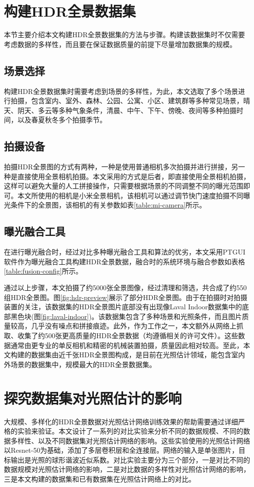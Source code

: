 \section{构建HDR全景数据集}

本节主要介绍本文构建HDR全景数据集的方法与步骤。构建该数据集时不仅需要考虑数据的多样性，而且要在保证数据质量的前提下尽量增加数据集的规模。
\subsection{场景选择}
构建HDR全景数据集时需要考虑到场景的多样性，为此，本文选取了多个场景进行拍摄，包含室内、室外、森林、公园、公寓、小区、建筑群等多种常见场景，晴天、阴天、多云等多种气象条件，清晨、中午、下午、傍晚、夜间等多种拍摄时间，以及春夏秋冬多个拍摄季节。
\subsection{拍摄设备}
拍摄HDR全景图的方式有两种，一种是使用普通相机多次拍摄并进行拼接，另一种是直接使用全景相机拍摄。本文采用的方式是后者，即直接使用全景相机拍摄，这样可以避免大量的人工拼接操作，只需要根据场景的不同调整不同的曝光范围即可。本文所使用的相机是小米全景相机\cite{xiaomi}，该相机可以通过调节快门速度拍摄不同曝光条件下的全景图，该相机的有关参数如表\ref{table:mi-camera}所示。
\subsection{曝光融合工具}
在进行曝光融合时，经过对比多种曝光融合工具和算法的优劣，本文采用PTGUI软件\cite{ptgui}作为曝光融合工具构建HDR全景数据，融合时的系统环境与融合参数如表格\ref{table:fusion-config}所示。


通过以上步骤，本文拍摄了约5000张全景图像，经过清理和筛选，共合成了约550组HDR全景图。图\ref{fig:hdr-preview}展示了部分HDR全景图。由于在拍摄时对拍摄装置的关注，该数据集的HDR全景图片底部没有出现像Laval Indoor数据集\cite{gardner2017learning}中的底部黑色块(图\ref{fig:laval-indoor})。该数据集包含了多种场景和光照条件，而且图片质量较高，几乎没有噪点和拼接痕迹。此外，作为工作之一，本文额外从网络上抓取、收集了约500张更高质量的HDR全景数据（均遵循相关的许可文件）。这些数据通常由更专业的单反相机和精密的机械装置拍摄，质量因此相对较高。至此，本文构建的数据集由近千张HDR全景图构成，是目前在光照估计领域，能包含室内外场景的数据集中，规模最大的HDR全景数据集。
\section{探究数据集对光照估计的影响}
大规模、多样化的HDR全景数据对光照估计网络训练效果的帮助需要通过详细严格的实验来验证。本文设计了一系列的对比实验来分析不同的数据规模、不同的数据多样性、以及不同数据集对光照估计网络的影响。这些实验使用的光照估计网络以Resnet-50\cite{he2016deep}为基础，添加了多层卷积层和全连接层。网络的输入是单张图片，目标输出是光照的球形谐波近似系数。对比实验主要分为三个部分，一是对比不同的数据规模对光照估计网络的影响，二是对比数据的多样性对光照估计网络的影响，三是本文构建的数据集和已有数据集在光照估计网络上的对比。

